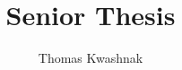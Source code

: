 \documentclass[12pt]{report}
\author{Thomas Kwashnak}
\title{Senior Thesis}
\begin{document}
\maketitle

\newpage

\tableofcontents

\newpage


\nocite{liu_ml_framework_tech_debt}

\newpage


\end{document}
